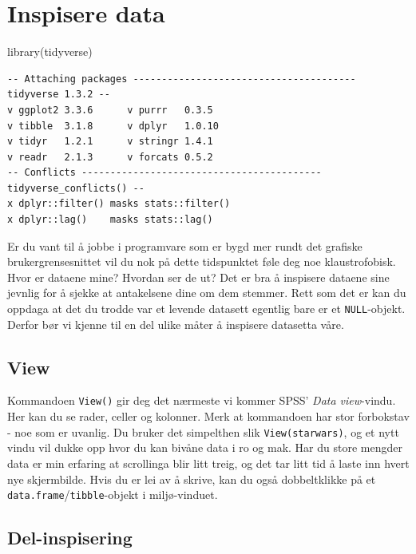 \documentclass[
  letterpaper,
  DIV=11,
  numbers=noendperiod]{scrreprt}
\newenvironment{Shaded}{\begin{snugshade}}{\end{snugshade}}
\newcommand{\FunctionTok}[1]{\textcolor[rgb]{0.28,0.35,0.67}{#1}}
\newcommand{\NormalTok}[1]{\textcolor[rgb]{0.00,0.23,0.31}{#1}}
\begin{document}

\hypertarget{inspisere-data}{%
\chapter{Inspisere data}\label{inspisere-data}}

\begin{Shaded}
\begin{Highlighting}[]
\FunctionTok{library}\NormalTok{(tidyverse)}
\end{Highlighting}
\end{Shaded}

\begin{verbatim}
-- Attaching packages --------------------------------------- tidyverse 1.3.2 --
v ggplot2 3.3.6      v purrr   0.3.5 
v tibble  3.1.8      v dplyr   1.0.10
v tidyr   1.2.1      v stringr 1.4.1 
v readr   2.1.3      v forcats 0.5.2 
-- Conflicts ------------------------------------------ tidyverse_conflicts() --
x dplyr::filter() masks stats::filter()
x dplyr::lag()    masks stats::lag()
\end{verbatim}

Er du vant til å jobbe i programvare som er bygd mer rundt det grafiske
brukergrensesnittet vil du nok på dette tidspunktet føle deg noe
klaustrofobisk. Hvor er dataene mine? Hvordan ser de ut? Det er bra å
inspisere dataene sine jevnlig for å sjekke at antakelsene dine om dem
stemmer. Rett som det er kan du oppdaga at det du trodde var et levende
datasett egentlig bare er et \texttt{NULL}-objekt. Derfor bør vi kjenne
til en del ulike måter å inspisere datasetta våre.

\hypertarget{view}{%
\section{View}\label{view}}

Kommandoen \texttt{View()} gir deg det nærmeste vi kommer SPSS'
\emph{Data view}-vindu. Her kan du se rader, celler og kolonner. Merk at
kommandoen har stor forbokstav - noe som er uvanlig. Du bruker det
simpelthen slik \texttt{View(starwars)}, og et nytt vindu vil dukke opp
hvor du kan bivåne data i ro og mak. Har du store mengder data er min
erfaring at scrollinga blir litt treig, og det tar litt tid å laste inn
hvert nye skjermbilde. Hvis du er lei av å skrive, kan du også
dobbeltklikke på et \texttt{data.frame}/\texttt{tibble}-objekt i
miljø-vinduet.

\hypertarget{del-inspisering}{%
\section{Del-inspisering}\label{del-inspisering}}
\end{document}

